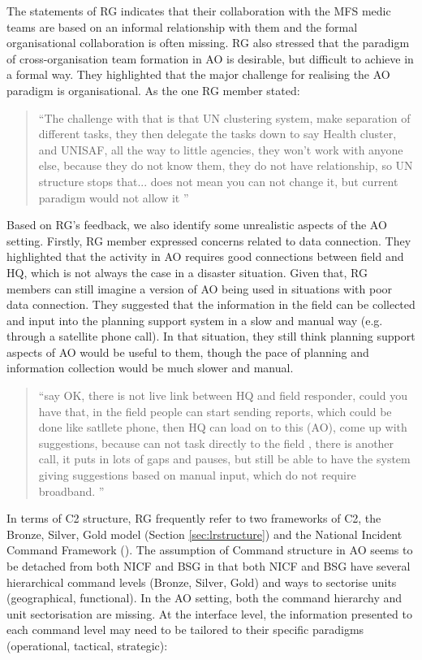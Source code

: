 The statements of \ac{RG} indicates that their collaboration with the MFS medic teams are based on an informal  relationship with them and the formal organisational collaboration is often missing. \ac{RG} also stressed that the paradigm of cross-organisation team formation in \ac{AO} is desirable, but difficult to achieve in a formal way. They highlighted that the major challenge for realising the \ac{AO} paradigm is organisational. As the one \ac{RG} member stated:\\

\begin{quotation}
``The challenge with that is that UN clustering system, make separation of different tasks, they then delegate the tasks down to say Health cluster, and UNISAF, all the way to little agencies, they won't work with anyone else, because they do not know them, they do not have relationship, so UN structure stops that... does not mean you can not change it, but current paradigm would not allow it ''
\end{quotation}

Based on \ac{RG}'s feedback, we also identify some unrealistic aspects of the \ac{AO} setting. Firstly, \ac{RG} member expressed concerns related to data connection. They highlighted that the activity in \ac{AO} requires good connections between field and HQ, which is not always the case in a disaster situation. Given that, \ac{RG} members can still imagine a version of \ac{AO} being used in situations with poor data connection. They suggested that the information in the field can be collected and input into the planning support system in a slow and manual way (e.g. through a satellite phone call). In that situation, they still think planning support aspects of \ac{AO} would be useful to them, though the pace of planning and information collection would be much slower and manual. \\
\begin{quotation}
``say  OK, there is not live link between HQ and field responder, could you have that, in the field people can start sending reports, which could be done like satllete phone, then HQ can load on to this (AO), come up with suggestions, because can not task directly to the field , there is another call,  it puts in lots of gaps and pauses, but still be able to have the system giving suggestions based on manual input, which do not require broadband. ''
\end{quotation}


In terms of \acf{C2} structure, RG frequently refer to two frameworks of \ac{C2},  the Bronze, Silver, Gold model (Section \ref{sec:lrstructure}) and the National Incident Command Framework (\cite{Command2008}). The assumption of Command structure in \ac{AO} seems to be detached from both NICF and \ac{BSG} in that both NICF and \ac{BSG} have several hierarchical command levels (Bronze, Silver, Gold) and ways to sectorise units (geographical, functional).  In the \ac{AO} setting, both the command hierarchy and unit sectorisation are missing. At the interface level, the information presented to each command level may need to be tailored to their specific paradigms (operational, tactical, strategic):

